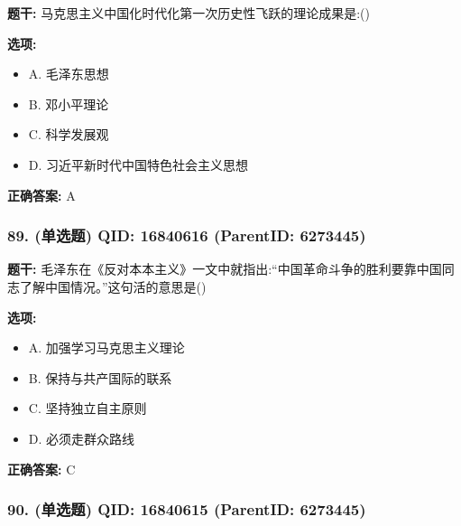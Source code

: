 \documentclass[12pt,UTF8]{ctexart}
\begin{document}
\textbf{题干:}
马克思主义中国化时代化第一次历史性飞跃的理论成果是:()



\textbf{选项:}
\begin{itemize}[leftmargin=*]

  \item A. 毛泽东思想

  \item B. 邓小平理论

  \item C. 科学发展观

  \item D. 习近平新时代中国特色社会主义思想

\end{itemize}

\textbf{正确答案:}
A

\vspace{0.3em}\hrulefill\vspace{0.7em}

\subsubsection*{89. (单选题) \small QID: 16840616 (ParentID: 6273445)}

\textbf{题干:}
毛泽东在《反对本本主义》一文中就指出:“中国革命斗争的胜利要靠中国同志了解中国情况。”这句活的意思是()



\textbf{选项:}
\begin{itemize}[leftmargin=*]

  \item A. 加强学习马克思主义理论

  \item B. 保持与共产国际的联系

  \item C. 坚持独立自主原则

  \item D. 必须走群众路线

\end{itemize}

\textbf{正确答案:}
C

\vspace{0.3em}\hrulefill\vspace{0.7em}

\subsubsection*{90. (单选题) \small QID: 16840615 (ParentID: 6273445)}
\end{document}
